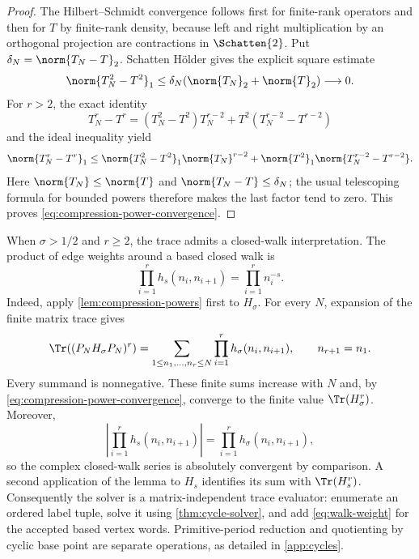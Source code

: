 \begin{proof}
The Hilbert--Schmidt convergence follows first for finite-rank operators and
then for $T$ by finite-rank density, because left and right multiplication by
an orthogonal projection are contractions in $\Schatten{2}$.  Put
$\delta_N=\norm{T_N-T}_2$.  Schatten H\"older gives the explicit square
estimate
\begin{equation}
  \norm{T_N^2-T^2}_1
  \le \delta_N(\norm{T_N}_2+\norm{T}_2)
  \longrightarrow0.
  \label{eq:compression-square-estimate}
\end{equation}
For $r>2$, the exact identity
\[
  T_N^r-T^r
  =(T_N^2-T^2)T_N^{r-2}
   +T^2(T_N^{r-2}-T^{r-2})
\]
and the ideal inequality yield
\[
  \norm{T_N^r-T^r}_1
  \le \norm{T_N^2-T^2}_1\norm{T_N}^{r-2}
   +\norm{T^2}_1\norm{T_N^{r-2}-T^{r-2}}.
\]
Here $\norm{T_N}\le\norm{T}$ and $\norm{T_N-T}\le\delta_N$; the usual
telescoping formula for bounded powers therefore makes the last factor tend
to zero.  This proves \cref{eq:compression-power-convergence}.
\end{proof}

When $\sigma>1/2$ and $r\ge2$, the trace admits a closed-walk
interpretation.  The product of edge weights around a based closed walk is
\begin{equation}
  \prod_{i=1}^r h_s(n_i,n_{i+1})
  =\prod_{i=1}^r n_i^{-s}.
  \label{eq:walk-weight}
\end{equation}
Indeed, apply \cref{lem:compression-powers} first to $H_\sigma$.  For every
$N$, expansion of the finite matrix trace gives
\[
  \Tr\!\left((P_NH_\sigma P_N)^r\right)
  =\sum_{1\le n_1,\ldots,n_r\le N}
    \prod_{i=1}^r h_\sigma(n_i,n_{i+1}),
  \qquad n_{r+1}=n_1.
\]
Every summand is nonnegative.  These finite sums increase with $N$ and,
by \cref{eq:compression-power-convergence}, converge to the finite value
$\Tr(H_\sigma^r)$.  Moreover,
\[
  \left|\prod_{i=1}^r h_s(n_i,n_{i+1})\right|
  =\prod_{i=1}^r h_\sigma(n_i,n_{i+1}),
\]
so the complex closed-walk series is absolutely convergent by comparison.
A second application of the lemma to $H_s$ identifies its sum with
$\Tr(H_s^r)$.  Consequently the solver is a matrix-independent trace
evaluator: enumerate an ordered label tuple, solve it using
\cref{thm:cycle-solver}, and add \cref{eq:walk-weight} for the accepted based
vertex words.  Primitive-period reduction and quotienting by cyclic base
point are separate operations, as detailed in \cref{app:cycles}.
